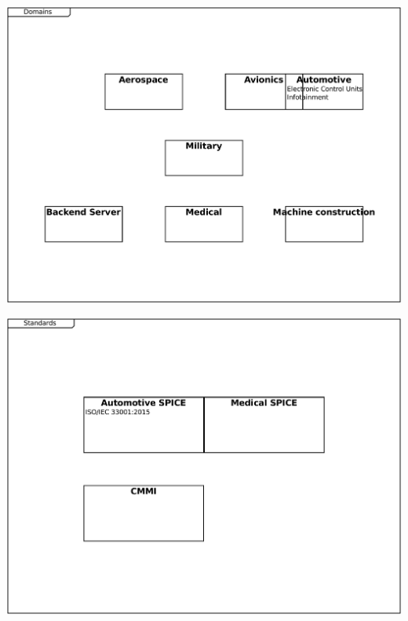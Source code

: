 \documentclass{article}
\begin{document}
\includegraphics[width= 1.0\linewidth]{quality_export/5_Domains.pdf}
\begin{alltt}

\end{alltt}

\includegraphics[width= 1.0\linewidth]{quality_export/6_Standards.pdf}
\begin{alltt}

\end{alltt}
\end{document}
